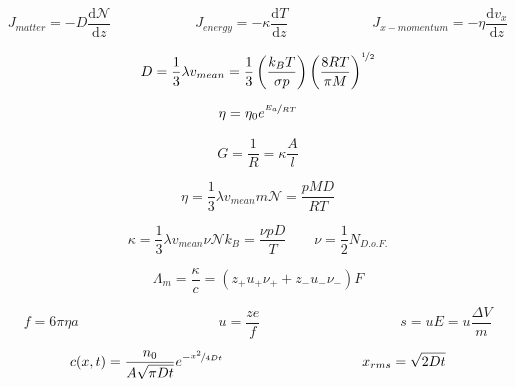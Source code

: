\documentclass[12pt, letterpaper]{memoir}
\begin{document}
\noindent

\begin{equation*}
	J_{matter}=-D\frac{\mathrm{d}\mathcal{N}}{\mathrm{d}z} \hspace{6em} J_{energy}=-\kappa\frac{\mathrm{d}T}{\mathrm{d}z} \hspace{6em} J_{x-momentum}=-\eta\frac{\mathrm{d}v_x}{\mathrm{d}z}
\end{equation*}

\noindent
\begin{minipage}[t]{0.5\linewidth}
	\begin{equation*}
		D=\frac{1}{3}\lambda v_{mean}=\frac{1}{3}\left(\frac{k_BT}{\sigma p}\right)\left(\frac{8RT}{\pi M}\right)^{\nicefrac{1}{2}}
	\end{equation*}
	
	\begin{equation*}
		\eta=\eta_0e^{\nicefrac{E_a}{RT}}
	\end{equation*}
	
	\begin{equation*}
		G=\frac{1}{R}=\kappa\frac{A}{l}
	\end{equation*}
\end{minipage}
\begin{minipage}[t]{0.5\linewidth}
	\begin{equation*}
		\eta = \frac{1}{3}\lambda v_{mean}m\mathcal{N}=\frac{pMD}{RT}
	\end{equation*}
	
	\begin{equation*}
		\kappa = \frac{1}{3} \lambda v_{mean}\nu\mathcal{N}k_B =  \frac{\nu pD}{T} \hspace{2em} \nu=\frac{1}{2}N_{D.o.F.}
	\end{equation*}
	
	\begin{equation*}
		\Lambda_m = \frac{\kappa}{c}=\left(z_+u_+\nu_++z_-u_-\nu_-\right)F
	\end{equation*}
\end{minipage}

\begin{equation*}
	f=6\pi\eta a \hspace{10em} u = \frac{ze}{f} \hspace{10em} s=uE=u\frac{\Delta V}{m}
\end{equation*}

\begin{equation*}
	c(x,t)=\frac{n_0}{A\sqrt{\pi Dt}}e^{-\nicefrac{x^2}{4Dt}} \hspace{10em} x_{rms}=\sqrt{2Dt}
\end{equation*}
\end{document}
